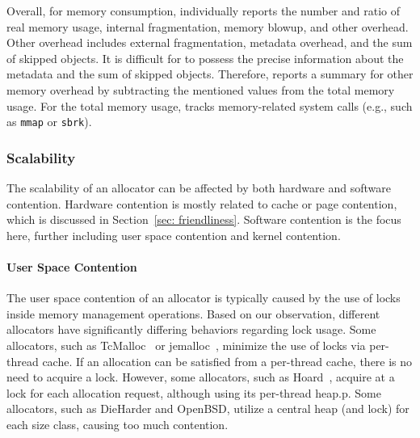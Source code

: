 
Overall, for memory consumption, \MP{} individually reports the number and ratio of real memory usage, internal fragmentation, memory blowup, and other overhead. Other overhead includes external fragmentation, metadata overhead, and the sum of skipped objects. It is difficult for \MP{} to possess the precise information about the metadata and the sum of skipped objects. Therefore, \MP{} reports a summary for other memory overhead by subtracting the mentioned values from the total memory usage. For the total memory usage, \MP{} tracks memory-related system calls (e.g., such as \texttt{mmap} or \texttt{sbrk}). 


\subsubsection{Scalability} 
\label{sec:scalability}

The scalability of an allocator can be affected by both hardware and software contention. Hardware contention is mostly related to cache or page contention, which is discussed in Section~\ref{sec: friendliness}. Software contention is the focus here, further including user space contention and kernel contention. 

\paragraph{User Space Contention} The user space contention of an allocator is typically caused by the use of locks inside memory management operations. Based on our observation, different allocators have significantly differing behaviors regarding lock usage. Some allocators, such as TcMalloc~\cite{tcmalloc} or jemalloc~\cite{jemalloc}, minimize the use of locks via per-thread cache. If an allocation can be satisfied from a per-thread cache, there is no need to acquire a lock. However, some allocators, such as Hoard~\cite{Hoard}, acquire at a lock for each allocation request, although using its per-thread heap.p. Some allocators, such as DieHarder and OpenBSD, utilize a central heap (and lock) for each size class, causing too much contention. 

